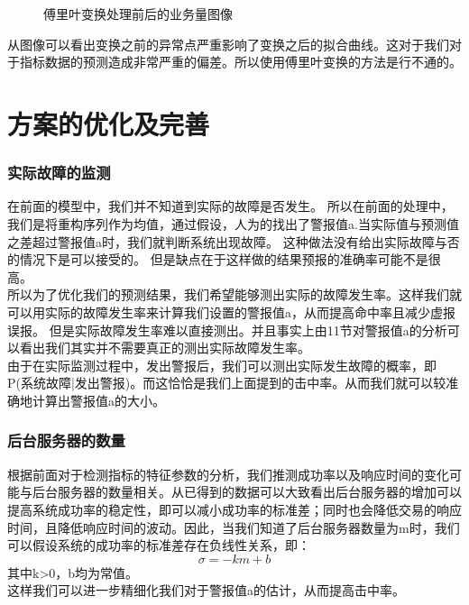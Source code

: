 \documentclass[a4paper]{article}
\begin{document}
\begin{figure}[h]
\begin{minipage}[t]{0.5\linewidth}
    \end{minipage}
	\caption{傅里叶变换处理前后的业务量图像}
     \label{fig:char}
\end{figure}
从图像可以看出变换之前的异常点严重影响了变换之后的拟合曲线。这对于我们对于指标数据的预测造成非常严重的偏差。所以使用傅里叶变换的方法是行不通的。

\part{方案的优化及完善}
\section{实际故障的监测}
\indent 在前面的模型中，我们并不知道到实际的故障是否发生。
所以在前面的处理中，我们是将重构序列作为均值，通过假设，人为的找出了警报值a.当实际值与预测值之差超过警报值a时，我们就判断系统出现故障。
这种做法没有给出实际故障与否的情况下是可以接受的。
但是缺点在于这样做的结果预报的准确率可能不是很高。 \\
\indent 所以为了优化我们的预测结果，我们希望能够测出实际的故障发生率。这样我们就可以用实际的故障发生率来计算我们设置的警报值a，从而提高命中率且减少虚报误报。
但是实际故障发生率难以直接测出。并且事实上由11节对警报值a的分析可以看出我们其实并不需要真正的测出实际故障发生率。\\
\indent 由于在实际监测过程中，发出警报后，我们可以测出实际发生故障的概率，即P(系统故障|发出警报)。而这恰恰是我们上面提到的击中率。从而我们就可以较准确地计算出警报值a的大小。
\section{后台服务器的数量}
\indent 根据前面对于检测指标的特征参数的分析，我们推测成功率以及响应时间的变化可能与后台服务器的数量相关。从已得到的数据可以大致看出后台服务器的增加可以提高系统成功率的稳定性，即可以减小成功率的标准差；同时也会降低交易的响应时间，且降低响应时间的波动。因此，当我们知道了后台服务器数量为m时，我们可以假设系统的成功率的标准差存在负线性关系，即：
\begin{equation}
\sigma=-km+b
\end{equation}
其中k>0，b均为常值。\\
这样我们可以进一步精细化我们对于警报值a的估计，从而提高击中率。	
\end{document}
